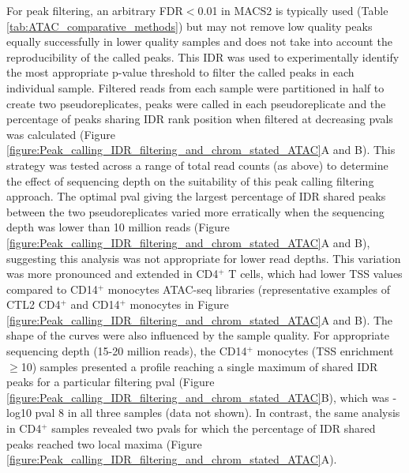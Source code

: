 For peak filtering, an arbitrary FDR$<$0.01 in MACS2 is typically used (Table \ref{tab:ATAC_comparative_methods}) but may not remove low quality peaks equally successfully in lower quality samples and does not take into account the reproducibility of the called peaks. This IDR was used to experimentally identify the most appropriate p-value threshold to filter the called peaks in each individual sample. Filtered reads from each sample were partitioned in half to create two pseudoreplicates, peaks were called in each pseudoreplicate and the percentage of peaks sharing IDR rank position when filtered at decreasing pvals was calculated (Figure \ref{figure:Peak_calling_IDR_filtering_and_chrom_stated_ATAC}A and B). This strategy was tested across a range of total read counts (as above) to determine the effect of sequencing depth on the suitability of this peak calling filtering approach. The optimal pval giving the largest percentage of IDR shared peaks between the two pseudoreplicates varied more erratically when the sequencing depth was lower than 10 million reads (Figure \ref{figure:Peak_calling_IDR_filtering_and_chrom_stated_ATAC}A and B), suggesting this analysis was not appropriate for lower read depths. This variation was more pronounced and extended in CD4$^+$ T cells, which had lower TSS values compared to CD14$^+$ monocytes ATAC-seq libraries (representative examples of CTL2 CD4$^+$ and CD14$^+$ monocytes in Figure \ref{figure:Peak_calling_IDR_filtering_and_chrom_stated_ATAC}A and B). The shape of the curves were also influenced by the sample quality. For appropriate sequencing depth (15-20 million reads), the CD14$^+$ monocytes (TSS enrichment $\geq$10) samples presented a profile reaching a single maximum of shared IDR peaks for a particular filtering pval (Figure \ref{figure:Peak_calling_IDR_filtering_and_chrom_stated_ATAC}B), which was -log10 pval 8 in all three samples (data not shown). In contrast, the same analysis in CD4$^+$ samples revealed two pvals for which the percentage of IDR shared peaks reached two local maxima (Figure \ref{figure:Peak_calling_IDR_filtering_and_chrom_stated_ATAC}A). 



